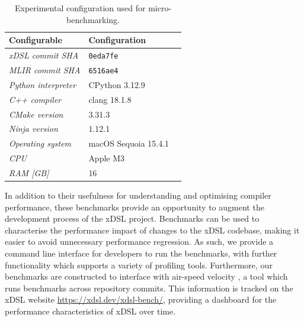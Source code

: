\begin{table}[H]
  \caption{Experimental configuration used for micro-benchmarking.}
  \label{tab:ubenchmark-experimental-config}
  \centering
  \begin{tabular}{lll}
    \toprule
    \textbf{Configurable} & \textbf{Configuration} \\
    \midrule
    \textit{xDSL commit SHA} & \texttt{0eda7fe} \\
    \textit{MLIR commit SHA} & \texttt{6516ae4} \\
    \midrule
    \textit{Python interpreter} & CPython 3.12.9 \\
    \textit{C++ compiler} & clang 18.1.8 \\
    \textit{CMake version} & 3.31.3 \\
    \textit{Ninja version} & 1.12.1 \\
    \textit{Operating system} & macOS Sequoia 15.4.1 \\
    \midrule
    \textit{CPU} & Apple M3 \\
    \textit{RAM [GB]} & 16 \\
    \bottomrule
  \end{tabular}
\end{table}


In addition to their usefulness for understanding and optimising compiler performance, these benchmarks provide an opportunity to augment the development process of the xDSL project.
Benchmarks can be used to characterise the performance impact of changes to the xDSL codebase, making it easier to avoid unnecessary performance regression.
As such, we provide a command line interface for developers to run the benchmarks, with further functionality which supports a variety of profiling tools.
Furthermore, our benchmarks are constructed to interface with air-speed velocity \cite{michaeldroettboomAirspeedvelocityAsv2025}, a tool which runs benchmarks across repository commits. This information is tracked on the xDSL website \url{https://xdsl.dev/xdsl-bench/}, providing a dashboard for the performance characteristics of xDSL over time.

